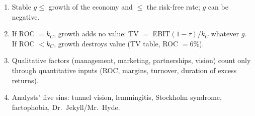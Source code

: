 \begin{trapbox}
\begin{enumerate}[leftmargin=*]
  \item Stable $g\leq$ growth of the economy and $\leq$ the risk-free rate; $g$ can be negative.
  \item If ROC $=k_C$, growth adds no value: TV $=$ EBIT$(1-\tau)/k_C$ whatever $g$. If ROC $<k_C$, growth destroys value (TV table, ROC $=6\%$).
  \item Qualitative factors (management, marketing, partnerships, vision) count only through quantitative inputs (ROC, margins, turnover, duration of excess returns).
  \item Analysts' five sins: tunnel vision, lemmingitis, Stockholm syndrome, factophobia, Dr.\ Jekyll/Mr.\ Hyde.
\end{enumerate}
\end{trapbox}
